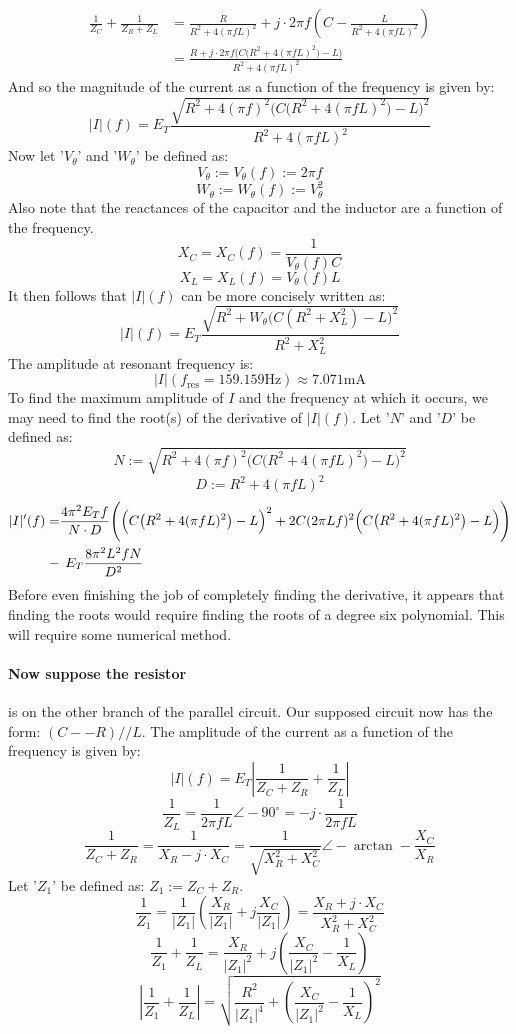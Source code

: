 \documentclass{article}
\begin{document}
	\begin{align*}
		\frac{1}{Z_C} + \frac{1}{Z_R + Z_L} &= \frac{R}{R^2+4(\pi f L)^2} + j 
		\cdot 2 \pi f\left(C - \frac{L}{R^2+4(\pi f L)^2}  \right) \\
		 &= \frac{R + j \cdot 2\pi f \Big(C\big(R^2+4(\pi f L)^2\big) - 
		 L\Big)}{R^2+4(\pi f L)^2}
	\end{align*}
	And so the magnitude of the current as a function of the frequency is given 
	by:
	$$ |I|(f) = E_T \frac{\sqrt{R^2 + 4(\pi f)^2\Big(C\big(R^2+4(\pi f 
	L)^2\big) - L\Big)^2}}{R^2+4(\pi f L)^2}$$
	Now let '$V_\theta$' and '$W_\theta$' be defined as:
	$$ V_\theta:=V_\theta(f):=2\pi f$$
	$$ W_\theta:=W_\theta(f):=V_\theta^2$$
	Also note that the reactances of the capacitor and the inductor are a 
	function of the frequency.
	$$ X_C = X_C(f) = \frac{1}{V_\theta (f)C}$$
	$$ X_L = X_L(f) = V_\theta (f)L$$ 
	It then follows that $|I|(f)$ can be more concisely written as:
	$$ |I|(f) = E_T \frac{\sqrt{R^2 + W_\theta\big(C(R^2 +X_L^2 ) - 
	L\big)^2}}{R^2 + X_L^2}$$
	The amplitude at resonant frequency is:
	$$ |I|(f_{\text{res}}=159.159 \text{Hz}) \approx 7.071 \text{mA}$$
	To find the maximum amplitude of $I$ and the frequency at which it occurs, 
	we may need to find the root(s) of the derivative of $|I|(f)$.
	Let '$N$' and '$D$' be defined as:
	$$ N:=\sqrt{R^2 + 4(\pi f)^2\Big(C\big(R^2+4(\pi f 
		L)^2\big) - L\Big)^2}$$
	$$ D:=R^2+4(\pi f L)^2$$
	\begin{align*}
		|I|'(f) =&\frac {4\pi^2 E_T f}{N\cdot D} \Bigg(\Big(C\big(R^2+4(\pi f 
		L)^2\big) - L\Big)^2 +  2C(2\pi Lf)^2\Big(C\big(R^2+4(\pi f 
		L)^2\big) - L\Big)\Bigg) \\
		 -& \hspace{1ex}E_T \frac{8\pi^2L^2 f N}{D^2}
	\end{align*}
	Before even finishing the job of completely finding the derivative, it 
	appears that finding the roots would require finding the roots of a degree 
	six polynomial.  This will require some numerical method.
	\paragraph[Swap]{Now suppose the resistor} is on the other branch of the 
	parallel circuit.  Our supposed circuit now has the form: $(C--R)//L$.  The 
	amplitude of the current as a function of the 
	frequency is given by:
	$$ |I|(f) = E_T\left| \frac{1}{Z_C+Z_R} + \frac{1}{Z_L} \right|$$
	$$ \frac{1}{Z_L} = \frac{1}{2\pi f L}\angle-90^{\circ} = - j\cdot 
	\frac{1}{2\pi f L}$$
	$$ \frac{1}{Z_C + Z_R} = \frac{1}{X_R - j \cdot X_C} =  
	\frac{1}{\sqrt{X_R^2 + X_C^2}}\angle-\arctan -\frac{X_C}{X_R}$$
	Let '$Z_1$' be defined as: $Z_1:=Z_C+Z_R$.
	$$ \frac{1}{Z_1} = \frac{1}{|Z_1|} \left( \frac{X_R}{|Z_1|} + j 
	\frac{X_C}{|Z_1|}\right) = \frac{X_R + j \cdot X_C}{X_R^2 + X_C^2}$$
	$$ \frac{1}{Z_1} + \frac{1}{Z_L} = \frac{X_R}{|Z_1|^2} + j \left( 
	\frac{X_C}{|Z_1|^2} - \frac{1}{X_L}\right)$$
	$$ \left| \frac{1}{Z_1} + \frac{1}{Z_L} \right| = \sqrt{\frac{R^2}{|Z_1|^4} 
	+ \left(\frac{X_C}{|Z_1|^2} - \frac{1}{X_L}\right)^2}$$
\end{document}
